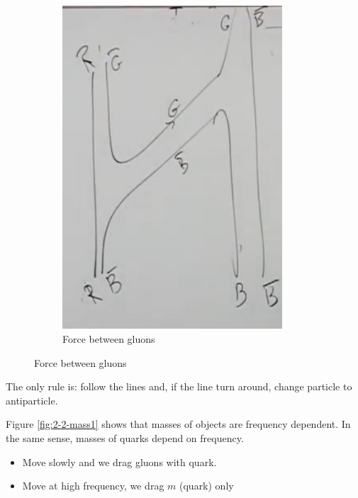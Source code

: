\documentclass[]{article}
\begin{document}
\begin{figure}[H]
\begin{subfigure}{0.45\textwidth}
	\end{subfigure}
		\begin{subfigure}{0.45\textwidth}
		\caption{Force between gluons}
		\includegraphics[width=0.9\textwidth]{2-2-gluon8}
	\end{subfigure}
\end{figure}

The only rule is: follow the lines and, if the line turn around, change particle to antiparticle.

Figure \ref{fig:2-2-mass1} shows that masses of objects are frequency dependent. In the same sense, masses of quarks depend on frequency.
\begin{itemize}
	\item  Move slowly and we drag gluons with quark.
	\item Move at high frequency, we drag $m$ (quark) only
\end{itemize}
\end{document}
